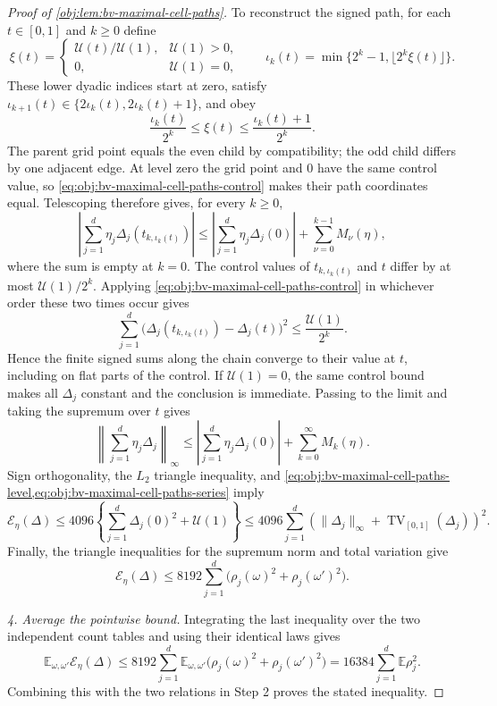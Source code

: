 \begin{proof}[Proof of \cref{obj:lem:bv-maximal-cell-paths}]
To reconstruct the signed path, for each \(t\in[0,1]\) and
\(k\ge0\) define
\[
\xi(t)=
\begin{cases}
\mathcal U(t)/\mathcal U(1),&\mathcal U(1)>0,\\
0,&\mathcal U(1)=0,
\end{cases}
\qquad
\iota_k(t)=\min\{2^k-1,\lfloor2^k\xi(t)\rfloor\}.
\]
These lower dyadic indices start at zero, satisfy
\(\iota_{k+1}(t)\in\{2\iota_k(t),2\iota_k(t)+1\}\), and obey
\[
\frac{\iota_k(t)}{2^k}\le\xi(t)
\le\frac{\iota_k(t)+1}{2^k}.
\]
The parent grid point equals the even child by compatibility; the odd
child differs by one adjacent edge. At level zero the grid point and
\(0\) have the same control value, so \cref{eq:obj:bv-maximal-cell-paths-control}
makes their path coordinates equal. Telescoping therefore gives, for
every \(k\ge0\),
\[
\left|\sum_{j=1}^d\eta_j
 \Delta_j(t_{k,\iota_k(t)})\right|
\le
\left|\sum_{j=1}^d\eta_j\Delta_j(0)\right|
+\sum_{\nu=0}^{k-1}M_\nu(\eta),
\]
where the sum is empty at \(k=0\). The control values of
\(t_{k,\iota_k(t)}\) and \(t\) differ by at most
\(\mathcal U(1)/2^k\). Applying
\cref{eq:obj:bv-maximal-cell-paths-control} in whichever order these
two times occur gives
\[
\sum_{j=1}^d
 \bigl(\Delta_j(t_{k,\iota_k(t)})-\Delta_j(t)\bigr)^2
\le \frac{\mathcal U(1)}{2^k}.
\]
Hence the finite signed sums along the chain converge to their value
at \(t\), including on flat parts of the control. If
\(\mathcal U(1)=0\), the same control bound makes all \(\Delta_j\)
constant and the conclusion is immediate. Passing to the limit and
taking the supremum over \(t\) gives
\[
\left\|\sum_{j=1}^d\eta_j\Delta_j\right\|_\infty
\le
\left|\sum_{j=1}^d\eta_j\Delta_j(0)\right|
 +\sum_{k=0}^\infty M_k(\eta).
\]
Sign orthogonality, the \(L_2\) triangle inequality, and
\cref{eq:obj:bv-maximal-cell-paths-level,eq:obj:bv-maximal-cell-paths-series}
imply
\[
\mathcal E_\eta(\Delta)
\le
4096\left\{
 \sum_{j=1}^d\Delta_j(0)^2+\mathcal U(1)
\right\}
\le
4096\sum_{j=1}^d
 \left(\|\Delta_j\|_\infty+
 \operatorname{TV}_{[0,1]}(\Delta_j)\right)^2.
\]
Finally, the triangle inequalities for the supremum norm and total
variation give
\[
\mathcal E_\eta(\Delta)
\le
8192\sum_{j=1}^d
 \bigl(\rho_j(\omega)^2+\rho_j(\omega')^2\bigr).
\]

\noindent\textit{4. Average the pointwise bound.}
Integrating the last inequality over the two independent count tables
and using their identical laws gives
\[
\mathbb E_{\omega,\omega'}\mathcal E_\eta(\Delta)
\le
8192\sum_{j=1}^d
 \mathbb E_{\omega,\omega'}
 \bigl(\rho_j(\omega)^2+\rho_j(\omega')^2\bigr)
=
16384\sum_{j=1}^d\mathbb E\rho_j^2.
\]
Combining this with the two relations in Step 2 proves the stated
inequality. %
\end{proof}
